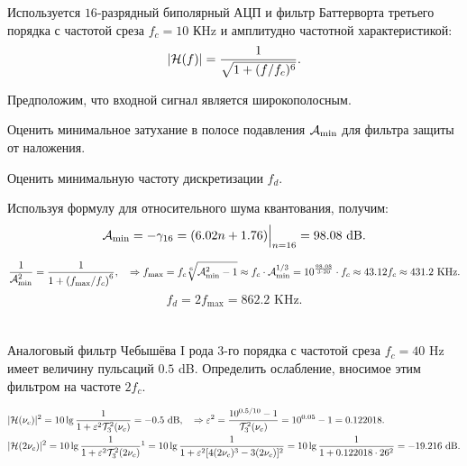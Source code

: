 \protect\thispagestyle{fancy}
\section{}
Используется $16$-разрядный биполярный АЦП и фильтр Баттерворта третьего порядка с частотой среза $f_c = 10$ КHz и амплитудно частотной характеристикой:
\[|\mathcal{H}(f)| = \dfrac{1}{\sqrt{1 + (f/f_c)^6}}.\]

Предположим, что входной сигнал является широкополосным.

Оценить минимальное затухание в полосе подавления $\mathcal{A}_{\min}$ для фильтра защиты от наложения.

Оценить минимальную частоту дискретизации $f_d$.

Используя формулу для относительного шума квантования, получим:
\begin{align*}
	\mathcal{A}_{\min} = -\gamma_{16} = (6.02n + 1.76)\Big|_{n=16} = 98.08 \text{ dB}.
\end{align*}

\begin{equation*}
	\dfrac{1}{\mathcal{A}^2_{\min}} = \dfrac{1}{1 + \left(f_{\max}/f_c\right)^6}, \quad \Rightarrow
	f_{\max} = f_c \sqrt[6]{\mathcal{A}^2_{\min} - 1} \approx f_c \cdot \mathcal{A}^{1/3}_{\min} = 10^{\frac{98.08}{3 \cdot 20}} \cdot f_c \approx 43.12 f_c \approx 431.2 \text{ KHz}.
\end{equation*}
\begin{equation*}
	f_d = 2f_{\max} = 862.2 \text{ KHz}.
\end{equation*}

\section{}
Аналоговый фильтр Чебышёва I рода $3$-го порядка с частотой среза $f_c = 40$ Hz имеет величину пульсаций $0.5$ dB. Определить ослабление, вносимое этим фильтром на частоте $2f_c$.

\begin{align*}
	&|\Capit{H}(\nu_c)|^2 = 10 \lg \dfrac{1}{1 + \varepsilon^2 \Capit{T}^2_3 (\nu_c)} = -0.5 \text{ dB}, \quad \Rightarrow
	\varepsilon^2 = \dfrac{10^{0.5/10} - 1}{\Capit{T}^2_3(\nu_c)} = 10^{0.05} - 1 = 0.122018.\\
	&|\Capit{H}(2\nu_c)|^2 = 10 \lg \dfrac{1}{1 + \varepsilon^2 \Capit{T}^2_3 (2\nu_c)}\footnotemark = 
	10 \lg \dfrac{1}{1 + \varepsilon^2 [4(2\nu_c)^3 - 3(2\nu_c)]^2} =
	10 \lg \dfrac{1}{1 + 0.122018 \cdot 26^2} = -19.216 \text{ dB}.
\end{align*}


